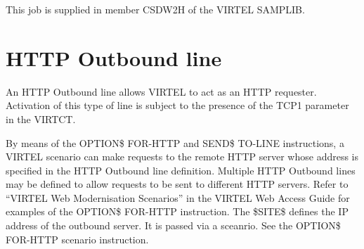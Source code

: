 \documentclass[letterpaper,10pt,english]{sphinxmanual}
\begin{document}
This job is supplied in member CSDW2H of the VIRTEL SAMPLIB.


\section{HTTP Outbound line}
\label{\detokenize{connectivity_guide:v457cn-httpoutbound}}\label{\detokenize{connectivity_guide:index-15}}\label{\detokenize{connectivity_guide:http-outbound-line}}
An HTTP Outbound line allows VIRTEL to act as an HTTP requester. Activation of this type of line is subject to the presence of the TCP1 parameter in the VIRTCT.

By means of the OPTION\$ FOR-HTTP and SEND\$ TO-LINE instructions, a VIRTEL scenario can make requests to the remote HTTP server whose address is specified in the HTTP Outbound line definition. Multiple HTTP Outbound lines may be defined to allow requests to be sent to different HTTP servers. Refer to “VIRTEL Web Modernisation Scenarios” in the VIRTEL Web Access Guide for examples of the OPTION\$ FOR-HTTP instruction. The \$SITE\$ defines the IP address of the outbound server. It is passed via a sceanrio. See the OPTION\$ FOR-HTTP scenario instruction.


\end{document}
